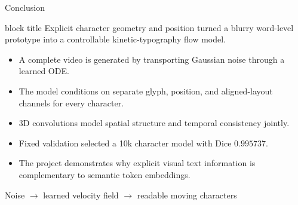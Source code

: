 \documentclass[aspectratio=169,xcolor=svgnames]{beamer}
\newcommand{\keypoint}[1]{%
\begin{center}
\begin{beamercolorbox}[rounded=true,shadow=true,wd=0.88\textwidth,sep=0.6em,center]{block title}
#1
\end{beamercolorbox}
\end{center}
}
\begin{document}
\begin{frame}{Conclusion}
\keypoint{Explicit character geometry and position turned a blurry word-level prototype into a controllable kinetic-typography flow model.}

\begin{itemize}
    \item A complete video is generated by transporting Gaussian noise through a learned ODE.
    \item The model conditions on separate glyph, position, and aligned-layout channels for every character.
    \item 3D convolutions model spatial structure and temporal consistency jointly.
    \item Fixed validation selected a 10k character model with Dice $0.995737$.
    \item The project demonstrates why explicit visual text information is complementary to semantic token embeddings.
\end{itemize}

\vspace{0.2cm}
\begin{center}
\Large
Noise $\longrightarrow$ learned velocity field $\longrightarrow$ readable moving characters
\end{center}
\end{frame}
\end{document}
